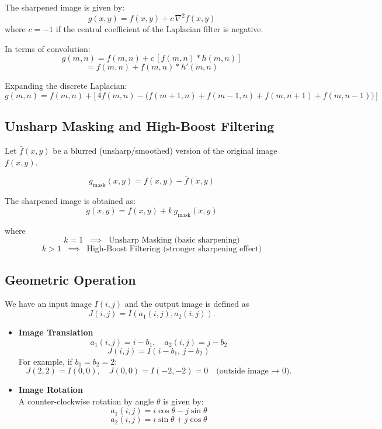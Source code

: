 The sharpened image is given by:
\[
g(x,y) = f(x,y) + c \, \nabla^2 f(x,y)
\]
where $c = -1$ if the central coefficient of the Laplacian filter is negative.

In terms of convolution:
\[
g(m,n) = f(m,n) + c \, [f(m,n) \ast h(m,n)]
\]
\[
= f(m,n) + f(m,n) \ast h'(m,n)
\]

Expanding the discrete Laplacian:
\[
g(m,n) = f(m,n) + \Big[\,4f(m,n) - \big(f(m+1,n) + f(m-1,n) + f(m,n+1) + f(m,n-1)\big)\,\Big]
\]

\subsection*{Unsharp Masking and High-Boost Filtering}

Let $\bar{f}(x,y)$ be a blurred (unsharp/smoothed) version of the original image $f(x,y)$.  

\[
g_{\text{mask}}(x,y) = f(x,y) - \bar{f}(x,y)
\]

The sharpened image is obtained as:  
\[
g(x,y) = f(x,y) + k \, g_{\text{mask}}(x,y)
\]

where  
\[
k = 1 \;\; \implies \;\; \text{Unsharp Masking (basic sharpening)}
\]  
\[
k > 1 \;\; \implies \;\; \text{High-Boost Filtering (stronger sharpening effect)}
\]

\subsection{Geometric Operation}

We have an input image $I(i,j)$ and the output image is defined as  
\[
J(i,j) = I(a_1(i,j), a_2(i,j)).
\]

\begin{itemize}
    \item \textbf{Image Translation}\\
    \[
    a_1(i,j) = i - b_1, \quad a_2(i,j) = j - b_2
    \]
    \[
    J(i,j) = I(i-b_1,\, j-b_2)
    \]
    For example, if $b_1 = b_2 = 2$:  
    \[
    J(2,2) = I(0,0), \quad J(0,0) = I(-2,-2) = 0 \quad \text{(outside image → 0)}.
    \]

    \item \textbf{Image Rotation}\\
    A counter-clockwise rotation by angle $\theta$ is given by:
    \[
    a_1(i,j) = i\cos\theta - j\sin\theta
    \]
    \[
    a_2(i,j) = i\sin\theta + j\cos\theta
    \]
\end{itemize}

